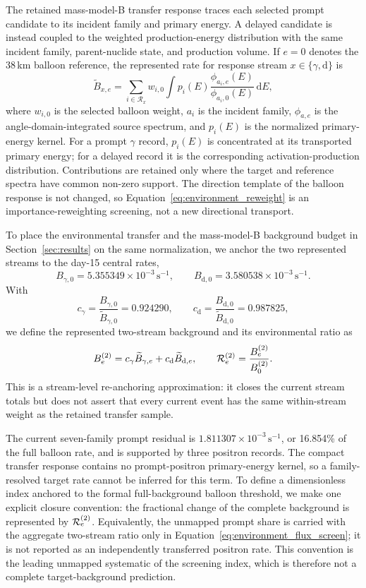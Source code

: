 \documentclass[11pt]{article}
\newcommand{\cps}{\ensuremath{\,\mathrm{s^{-1}}}}
\begin{document}
The retained mass-model-B transfer response traces each selected prompt candidate to
its incident family and primary energy. A delayed candidate is instead coupled
to the weighted production-energy distribution with the same incident family,
parent-nuclide state, and production volume. If $e=0$ denotes the 38\,km
balloon reference, the represented rate for response stream
$x\in\{\gamma,\mathrm d\}$ is
\begin{equation}
 \widetilde B_{x,e}=
 \sum_{i\in\mathcal R_x}w_{i,0}
 \int p_i(E)
 \frac{\phi_{a_i,e}(E)}{\phi_{a_i,0}(E)}
 \,\mathrm dE ,
 \label{eq:environment_reweight}
\end{equation}
where $w_{i,0}$ is the selected balloon weight, $a_i$ is the incident family,
$\phi_{a,e}$ is the angle-domain-integrated source spectrum, and $p_i(E)$ is
the normalized primary-energy kernel. For a prompt $\gamma$ record, $p_i(E)$
is concentrated at its transported primary energy; for a delayed record it is
the corresponding activation-production distribution. Contributions are
retained only where the target and reference spectra have common non-zero
support. The direction template of the balloon response is not changed, so
Equation~\eqref{eq:environment_reweight} is an importance-reweighting
screening, not a new directional transport.

To place the environmental transfer and the mass-model-B background budget in
Section~\ref{sec:results} on the same normalization, we anchor the two
represented streams to the day-15 central rates,
\[
 B_{\gamma,0}=5.355349\times10^{-3}\cps,\qquad
 B_{\mathrm d,0}=3.580538\times10^{-3}\cps .
\]
With
\[
 c_\gamma=\frac{B_{\gamma,0}}{\widetilde B_{\gamma,0}}=0.924290,
 \qquad
 c_{\mathrm d}=\frac{B_{\mathrm d,0}}{\widetilde B_{\mathrm d,0}}=0.987825,
\]
we define the represented two-stream background and its environmental ratio as
\begin{equation}
 B^{(2)}_e=c_\gamma\widetilde B_{\gamma,e}
          +c_{\mathrm d}\widetilde B_{\mathrm d,e},
 \qquad
 {\cal R}^{(2)}_e=\frac{B^{(2)}_e}{B^{(2)}_0}.
 \label{eq:environment_two_stream}
\end{equation}
This is a stream-level re-anchoring approximation: it closes the current
stream totals but does not assert that every current event has the same
within-stream weight as the retained transfer sample.

The current seven-family prompt residual is
$1.811307\times10^{-3}\cps$, or 16.854\% of the full balloon rate, and is
supported by three positron records. The compact transfer response contains no
prompt-positron primary-energy kernel, so a family-resolved target rate cannot
be inferred for this term. To define a dimensionless index anchored to the
formal full-background balloon threshold, we make one explicit closure
convention: the fractional change of the complete background is represented by
$ {\cal R}^{(2)}_e$. Equivalently, the unmapped prompt share is carried with the
aggregate two-stream ratio only in Equation~\eqref{eq:environment_flux_screen};
it is not reported as an independently transferred positron rate. This
convention is the leading unmapped systematic of the screening index, which is
therefore not a complete target-background prediction.
\end{document}
